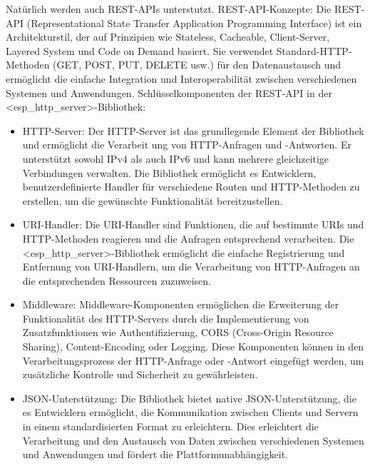 Natürlich werden auch REST-APIs unterstutzt.
\newline
REST-API-Konzepte:
\newline
Die REST-API (Representational State Transfer Application Programming Interface) ist ein Architekturstil, der auf Prinzipien wie Stateless, Cacheable, Client-Server, Layered System und Code on Demand basiert. 
Sie verwendet Standard-HTTP-Methoden (GET, POST, PUT, DELETE usw.) für den Datenaustausch und ermöglicht die einfache Integration und Interoperabilität zwischen verschiedenen Systemen und Anwendungen.
\newline
Schlüsselkomponenten der REST-API in der <esp\_http\_server>-Bibliothek:
\begin{itemize}
    \item HTTP-Server:
    Der HTTP-Server ist das grundlegende Element der Bibliothek und ermöglicht die Verarbeit ung von HTTP-Anfragen und -Antworten. Er unterstützt sowohl 
    IPv4 als auch IPv6 und kann mehrere gleichzeitige Verbindungen verwalten. Die Bibliothek ermöglicht es Entwicklern, benutzerdefinierte Handler 
    für verschiedene Routen und HTTP-Methoden zu erstellen, um die gewünschte Funktionalität bereitzustellen.
    \item URI-Handler:
    Die URI-Handler sind Funktionen, die auf bestimmte URIs und HTTP-Methoden reagieren und die Anfragen entsprechend verarbeiten. 
    Die <esp\_http\_server>-Bibliothek ermöglicht die einfache Registrierung 
    und Entfernung von URI-Handlern, um die Verarbeitung von HTTP-Anfragen an die entsprechenden Ressourcen zuzuweisen.
    \item Middleware:
    Middleware-Komponenten ermöglichen die Erweiterung der Funktionalität des HTTP-Servers durch die Implementierung 
    von Zusatzfunktionen wie Authentifizierung, CORS (Cross-Origin Resource Sharing), Content-Encoding oder Logging. 
    Diese Komponenten können in den Verarbeitungsprozess der HTTP-Anfrage oder -Antwort eingefügt werden, um zusätzliche Kontrolle und Sicherheit zu gewährleisten.
    \item JSON-Unterstützung:
    Die Bibliothek bietet native JSON-Unterstützung, die es Entwicklern ermöglicht, die Kommunikation zwischen 
    Clients und Servern in einem standardisierten Format zu erleichtern. 
    Dies erleichtert die Verarbeitung und den Austausch von Daten zwischen verschiedenen Systemen und Anwendungen und fördert die Plattformunabhängigkeit. 
\end{itemize}




